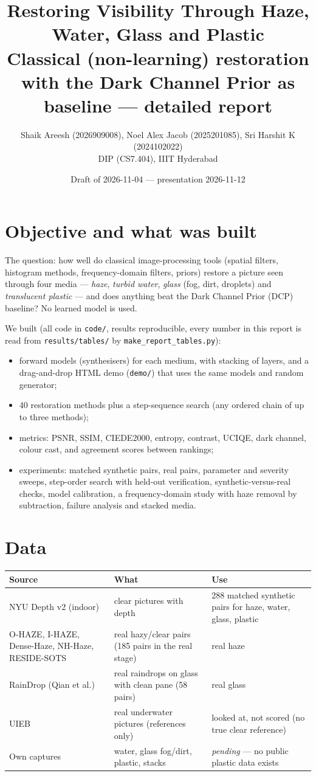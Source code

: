 \documentclass[10pt,a4paper]{article}
\title{Restoring Visibility Through Haze, Water, Glass and Plastic\\\large Classical (non-learning) restoration with the Dark Channel Prior as baseline --- detailed report}
\author{Shaik Areesh (2026909008), Noel Alex Jacob (2025201085), Sri Harshit K (2024102022)\\ DIP (CS7.404), IIIT Hyderabad}
\date{Draft of 2026-11-04 --- presentation 2026-11-12}
\begin{document}
\maketitle
\tableofcontents

\section{Objective and what was built}
The question: how well do classical image-processing tools (spatial filters, histogram methods, frequency-domain filters, priors) restore a picture seen through four media --- \emph{haze}, \emph{turbid water}, \emph{glass} (fog, dirt, droplets) and \emph{translucent plastic} --- and does anything beat the Dark Channel Prior (DCP) baseline? No learned model is used.

We built (all code in \texttt{code/}, results reproducible, every number in this report is read from \texttt{results/tables/} by \texttt{make\_report\_tables.py}):
\begin{itemize}
\item forward models (synthesisers) for each medium, with stacking of layers, and a drag-and-drop HTML demo (\texttt{demo/}) that uses the same models and random generator;
\item 40 restoration methods plus a step-sequence search (any ordered chain of up to three methods);
\item metrics: PSNR, SSIM, CIEDE2000, entropy, contrast, UCIQE, dark channel, colour cast, and agreement scores between rankings;
\item experiments: matched synthetic pairs, real pairs, parameter and severity sweeps, step-order search with held-out verification, synthetic-versus-real checks, model calibration, a frequency-domain study with haze removal by subtraction, failure analysis and stacked media.
\end{itemize}

\section{Data}
\small\begin{tabular}{p{3.4cm}p{6.4cm}p{6cm}}\toprule
Source & What & Use\\\midrule
NYU Depth v2 (indoor) & clear pictures with depth & 288 matched synthetic pairs for haze, water, glass, plastic\\
O-HAZE, I-HAZE, Dense-Haze, NH-Haze, RESIDE-SOTS & real hazy/clear pairs (185 pairs in the real stage) & real haze\\
RainDrop (Qian et al.) & real raindrops on glass with clean pane (58 pairs) & real glass\\
UIEB & real underwater pictures (references only) & looked at, not scored (no true clear reference)\\
Own captures & water, glass fog/dirt, plastic, stacks & \emph{pending} --- no public plastic data exists\\\bottomrule
\end{tabular}
\end{document}
